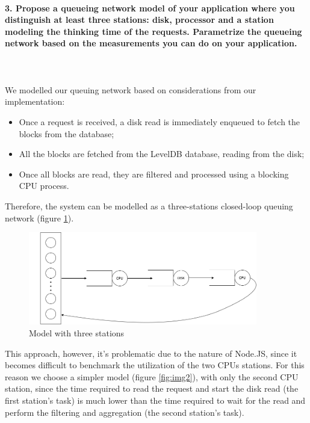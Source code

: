 \documentclass[11pt]{scrartcl} %
\begin{document}
\paragraph*{3. Propose a queueing network model of your application where you distinguish at least three stations: disk, processor and a station modeling the thinking time of the requests. Parametrize the queueing network based on the measurements you can do on your application.} \mbox{}\\\\

We modelled our queuing network based on considerations from our implementation:

\begin{itemize}
\item[\adforn{43}] Once a request is received, a disk read is immediately enqueued to fetch the blocks from the database;
\item[\adforn{43}] All the blocks are fetched from the LevelDB database, reading from the disk;
\item[\adforn{43}] Once all blocks are read, they are filtered and processed using a blocking CPU process.
\end{itemize}

Therefore, the system can be modelled as a three-stations closed-loop queuing network (figure \ref{fig:img1}).

\begin{figure}[H]
\includegraphics[width=10cm]{Images/img1.png}
\centering
\caption{Model with three stations}
\label{fig:img1}
\end{figure}

This approach, however, it's problematic due to the nature of Node.JS, since it becomes difficult to benchmark the utilization of the two CPUs stations. For this reason we choose a simpler model (figure \ref{fig:img2}), with only the second CPU station, since the time required to read the request and start the disk read (the first station's task) is much lower than the time required to wait for the read and perform the filtering and aggregation (the second station's task).
\end{document}
